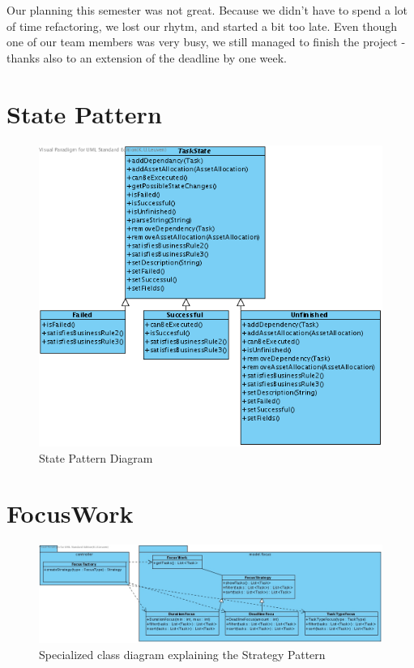 			Our planning this semester was not great. Because we didn't have to spend a lot of time refactoring, we lost our rhytm, and started a bit too late. Even though one of our team members was very busy, we still managed to finish the project - thanks also to an extension of the deadline by one week.
		
	\newpage
	\appendix
	\section{State Pattern}
	\begin{figure}[H]
		\begin{center}
			\includegraphics[scale=0.6]{images/State_Pattern.png}
		\end{center}
		\caption{State Pattern Diagram}
	\end{figure}
	\section{FocusWork}
	\begin{figure}[H]
		\begin{center}
			\includegraphics[scale=0.5]{images/focus_class_diagram.jpg}
		\end{center}
		\caption{Specialized class diagram explaining the Strategy Pattern}
	\end{figure}
